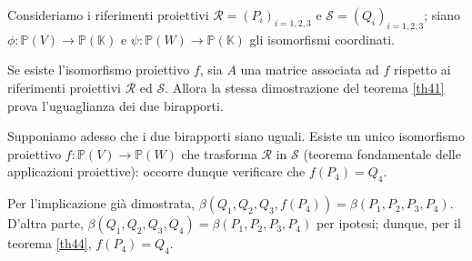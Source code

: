\Proof Consideriamo i riferimenti proiettivi $\mathcal{R} = (P_i)_{i = 1,2,3}$ e $\mathcal{S} = (Q_i)_{i = 1,2,3}$; siano $\phi: \mathbb{P}(V) \rightarrow \mathbb{P}(\mathbb{K})$ e $\psi: \mathbb{P}(W) \rightarrow \mathbb{P}(\mathbb{K})$ gli isomorfismi coordinati.
	\par Se esiste l'isomorfismo proiettivo $f$, sia $A$ una matrice associata ad $f$ rispetto ai riferimenti proiettivi $\mathcal{R}$ ed $\mathcal{S}$. Allora la stessa dimostrazione del teorema \ref{th41} prova l'uguaglianza dei due birapporti.
	\par Supponiamo adesso che i due birapporti siano uguali. Esiste un unico isomorfismo proiettivo $f: \mathbb{P}(V) \rightarrow \mathbb{P}(W)$ che trasforma $\mathcal{R}$ in $\mathcal{S}$ (teorema fondamentale delle applicazioni proiettive): occorre dunque verificare che $f(P_4) = Q_4$.
	\par Per l'implicazione gi\`a dimostrata, $\beta(Q_1, Q_2, Q_3, f(P_4)) = \beta(P_1, P_2, P_3, P_4)$. D'altra parte, $\beta(Q_1,Q_2,Q_3,Q_4) = \beta(P_1,P_2,P_3,P_4)$ per ipotesi; dunque, per il teorema \ref{th44}, $f(P_4) = Q_4$. \EndProof
